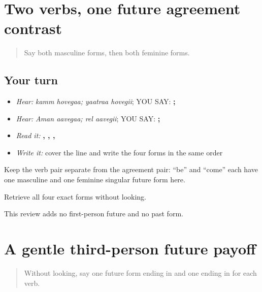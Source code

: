 \section[\texorpdfstring{\pa{ਹੋਵੇਗਾ} · \pa{ਹੋਵੇਗੀ} … (hovegaa …)}{ਹੋਵੇਗਾ · ਹੋਵੇਗੀ … (hovegaa …)}]{Two verbs, one future agreement contrast}

\label{lesson:PA-C186-future-review}



\begin{quote}
Say both masculine forms, then both feminine forms.
\end{quote}

\subsection*{Your turn}
\begin{itemize}
\raggedright
  \item \emph{Hear:} \emph{kamm hovegaa; yaatraa hovegii}; YOU SAY: \textbf{ ;  }
  \item \emph{Hear:} \emph{Aman aavegaa; rel aavegii}; YOU SAY: \textbf{ ;  }
  \item \emph{Read it:} \textbf{, , , }
  \item \emph{Write it:} cover the line and write the four forms in the same order
\end{itemize}

Keep the verb pair separate from the agreement pair: “be” and “come” each have one masculine and one feminine singular future form here.

\begin{tcolorbox}[breakable,colback=teal!4,colframe=teal!35!black,title={Before you move on}]
Retrieve all four exact forms without looking.

This review adds no first-person future and no past form.
\end{tcolorbox}
\section[\texorpdfstring{\pa{ਕੰਮ} \pa{ਹੋਵੇਗਾ} · \pa{ਯਾਤਰਾ} … (kamm hovegaa …)}{ਕੰਮ ਹੋਵੇਗਾ · ਯਾਤਰਾ … (kamm hovegaa …)}]{A gentle third-person future payoff}

\label{lesson:PA-C186-payoff}



\begin{quote}
Without looking, say one future form ending in \textbf{} and one ending in \textbf{} for each verb.
\end{quote}


